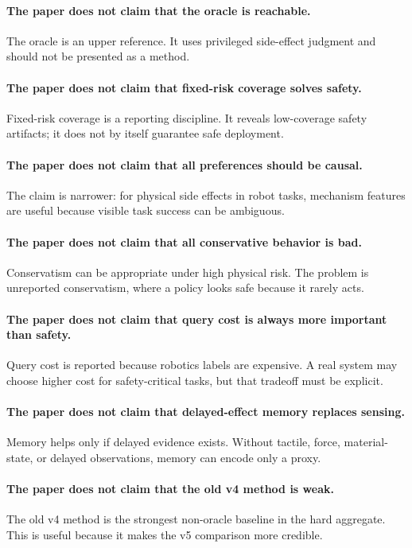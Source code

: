 \documentclass{article}
\begin{document}
\paragraph{The paper does not claim that the oracle is reachable.}
The oracle is an upper reference. It uses privileged side-effect judgment and should not be presented as a method.

\paragraph{The paper does not claim that fixed-risk coverage solves safety.}
Fixed-risk coverage is a reporting discipline. It reveals low-coverage safety artifacts; it does not by itself guarantee safe deployment.

\paragraph{The paper does not claim that all preferences should be causal.}
The claim is narrower: for physical side effects in robot tasks, mechanism features are useful because visible task success can be ambiguous.

\paragraph{The paper does not claim that all conservative behavior is bad.}
Conservatism can be appropriate under high physical risk. The problem is unreported conservatism, where a policy looks safe because it rarely acts.

\paragraph{The paper does not claim that query cost is always more important than safety.}
Query cost is reported because robotics labels are expensive. A real system may choose higher cost for safety-critical tasks, but that tradeoff must be explicit.

\paragraph{The paper does not claim that delayed-effect memory replaces sensing.}
Memory helps only if delayed evidence exists. Without tactile, force, material-state, or delayed observations, memory can encode only a proxy.

\paragraph{The paper does not claim that the old v4 method is weak.}
The old v4 method is the strongest non-oracle baseline in the hard aggregate. This is useful because it makes the v5 comparison more credible.
\end{document}
